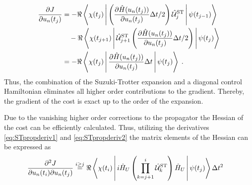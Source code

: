 \begin{align}
	\frac{\partial J}{\partial u_n (t_j)} &= - \Re \Braket{\chi (t_j) |  \left(  \frac{\partial \hat{H} (u_n (t_j))}{\partial u_n (t_j)} \Delta t /2 \right) \hat{\mathcal{U}}_{j}^{\mathrm{ST}} | \psi (t_{j-1})} \nonumber \\
	& \quad - \Re \Braket{\chi (t_{j+1}) | \hat{\mathcal{U}}_{j+1}^{\mathrm{ST}} \left(  \frac{\partial \hat{H} (u_n (t_j))}{\partial u_n (t_j)} \Delta t /2 \right) | \psi (t_{j})} \nonumber \\
	&= - \Re \Braket{\chi (t_j) | \frac{\partial \hat{H} (u_n (t_j))}{\partial u_n (t_j)} \Delta t | \psi (t_{j})} \; . \label{eq:STcostgrad}
\end{align}  
Thus, the combination of the Suzuki-Trotter expansion and a diagonal control Hamiltonian eliminates all higher order contributions to the gradient. Thereby, the gradient of the cost is exact up to the order of the expansion.

Due to the vanishing higher order corrections to the propagator the Hessian of the cost can be efficiently calculated. Thus, utilizing the derivatives \eqref{eq:STpropderiv1} and \eqref{eq:STpropderiv2} the matrix elements of the Hessian can be expressed as 
\begin{align}
	\frac{\partial^ 2 J}{\partial u_n (t_i) \partial u_n (t_j)} & \overset{i \geq j}{=} \Re \Braket{ \chi(t_i) | i \hat{H}_U \left( \prod_{k = j +1 }^{i} \hat{\mathcal{U}}_{k}^{\mathrm{ST}} \right) \hat{H}_U | \psi(t_j)  } \Delta t^2
\end{align}